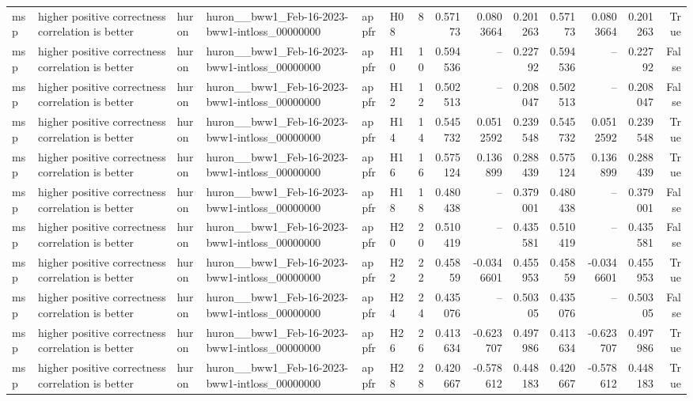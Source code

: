 \begin{longtable}{llllllrrrrrrrr}
msp & higher positive correctness correlation is better & huron & huron\_\_bww1\_Feb-16-2023-bww1-intloss\_00000000 & appfr & H08 & 8 & 0.57173 & 0.0803664 & 0.201263 & 0.57173 & 0.0803664 & 0.201263 & True \\
msp & higher positive correctness correlation is better & huron & huron\_\_bww1\_Feb-16-2023-bww1-intloss\_00000000 & appfr & H10 & 10 & 0.594536 & -- & 0.22792 & 0.594536 & -- & 0.22792 & False \\
msp & higher positive correctness correlation is better & huron & huron\_\_bww1\_Feb-16-2023-bww1-intloss\_00000000 & appfr & H12 & 12 & 0.502513 & -- & 0.208047 & 0.502513 & -- & 0.208047 & False \\
msp & higher positive correctness correlation is better & huron & huron\_\_bww1\_Feb-16-2023-bww1-intloss\_00000000 & appfr & H14 & 14 & 0.545732 & 0.0512592 & 0.239548 & 0.545732 & 0.0512592 & 0.239548 & True \\
msp & higher positive correctness correlation is better & huron & huron\_\_bww1\_Feb-16-2023-bww1-intloss\_00000000 & appfr & H16 & 16 & 0.575124 & 0.136899 & 0.288439 & 0.575124 & 0.136899 & 0.288439 & True \\
msp & higher positive correctness correlation is better & huron & huron\_\_bww1\_Feb-16-2023-bww1-intloss\_00000000 & appfr & H18 & 18 & 0.480438 & -- & 0.379001 & 0.480438 & -- & 0.379001 & False \\
msp & higher positive correctness correlation is better & huron & huron\_\_bww1\_Feb-16-2023-bww1-intloss\_00000000 & appfr & H20 & 20 & 0.510419 & -- & 0.435581 & 0.510419 & -- & 0.435581 & False \\
msp & higher positive correctness correlation is better & huron & huron\_\_bww1\_Feb-16-2023-bww1-intloss\_00000000 & appfr & H22 & 22 & 0.45859 & -0.0346601 & 0.455953 & 0.45859 & -0.0346601 & 0.455953 & True \\
msp & higher positive correctness correlation is better & huron & huron\_\_bww1\_Feb-16-2023-bww1-intloss\_00000000 & appfr & H24 & 24 & 0.435076 & -- & 0.50305 & 0.435076 & -- & 0.50305 & False \\
msp & higher positive correctness correlation is better & huron & huron\_\_bww1\_Feb-16-2023-bww1-intloss\_00000000 & appfr & H26 & 26 & 0.413634 & -0.623707 & 0.497986 & 0.413634 & -0.623707 & 0.497986 & True \\
msp & higher positive correctness correlation is better & huron & huron\_\_bww1\_Feb-16-2023-bww1-intloss\_00000000 & appfr & H28 & 28 & 0.420667 & -0.578612 & 0.448183 & 0.420667 & -0.578612 & 0.448183 & True \\

\end{longtable}
